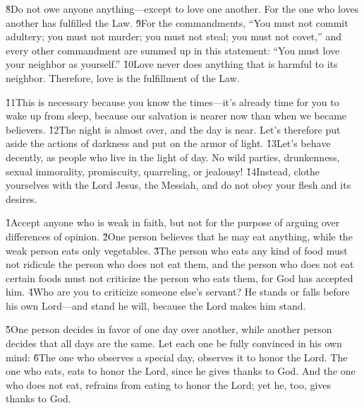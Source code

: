 \v{8}Do not owe anyone anything---except to love one another. For the one who loves another has fulfilled the Law. \v{9}For the commandments, ``You must not commit adultery; you must not murder; you must not steal; you must not covet,'' and every other commandment are summed up in this statement: ``You must love your neighbor as yourself.'' \v{10}Love never does anything that is harmful to its neighbor. Therefore, love is the fulfillment of the Law.

\v{11}This is necessary because you know the times---it's already time for you to wake up from sleep, because our salvation is nearer now than when we became believers. \v{12}The night is almost over, and the day is near. Let's therefore put aside the actions of darkness and put on the armor of light. \v{13}Let's behave decently, as people who live in the light of day. No wild parties, drunkenness, sexual immorality, promiscuity, quarreling, or jealousy! \v{14}Instead, clothe yourselves with the Lord Jesus, the Messiah, and do not obey your flesh and its desires.

\v{1}Accept anyone who is weak in faith, but not for the purpose of arguing over differences of opinion. \v{2}One person believes that he may eat anything, while the weak person eats only vegetables. \v{3}The person who eats any kind of food must not ridicule the person who does not eat them, and the person who does not eat certain foods must not criticize the person who eats them, for God has accepted him. \v{4}Who are you to criticize someone else's servant? He stands or falls before his own Lord---and stand he will, because the Lord makes him stand.

\v{5}One person decides in favor of one day over another, while another person decides that all days are the same. Let each one be fully convinced in his own mind: \v{6}The one who observes a special day, observes it to honor the Lord. The one who eats, eats to honor the Lord, since he gives thanks to God. And the one who does not eat, refrains from eating to honor the Lord; yet he, too, gives thanks to God.

